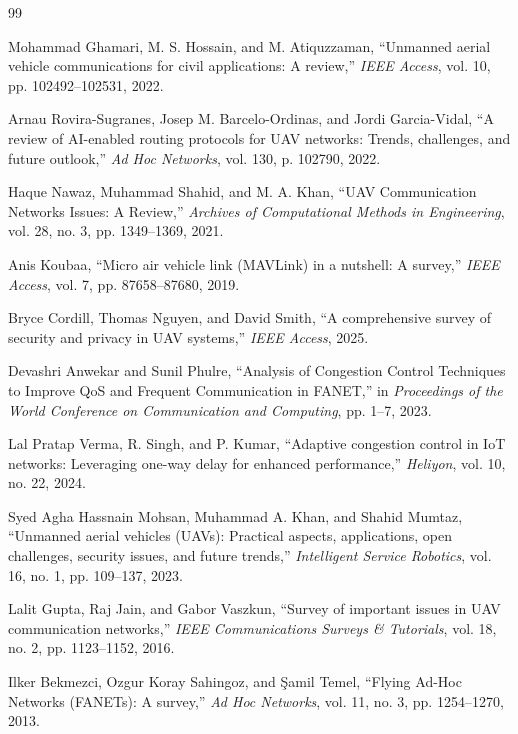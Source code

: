 \begin{thebibliography}{99}

Mohammad Ghamari, M. S. Hossain, and M. Atiquzzaman,
``Unmanned aerial vehicle communications for civil applications: A review,''
\textit{IEEE Access},
vol. 10, pp. 102492--102531, 2022.

Arnau Rovira-Sugranes, Josep M. Barcelo-Ordinas, and Jordi Garcia-Vidal,
``A review of AI-enabled routing protocols for UAV networks: Trends, challenges, and future outlook,''
\textit{Ad Hoc Networks},
vol. 130, p. 102790, 2022.

Haque Nawaz, Muhammad Shahid, and M. A. Khan,
``UAV Communication Networks Issues: A Review,''
\textit{Archives of Computational Methods in Engineering},
vol. 28, no. 3, pp. 1349--1369, 2021.

Anis Koubaa,
``Micro air vehicle link (MAVLink) in a nutshell: A survey,''
\textit{IEEE Access},
vol. 7, pp. 87658--87680, 2019.

Bryce Cordill, Thomas Nguyen, and David Smith,
``A comprehensive survey of security and privacy in UAV systems,''
\textit{IEEE Access}, 2025.

Devashri Anwekar and Sunil Phulre,
``Analysis of Congestion Control Techniques to Improve QoS and Frequent Communication in FANET,''
in \textit{Proceedings of the World Conference on Communication and Computing},
pp. 1--7, 2023.

Lal Pratap Verma, R. Singh, and P. Kumar,
``Adaptive congestion control in IoT networks: Leveraging one-way delay for enhanced performance,''
\textit{Heliyon},
vol. 10, no. 22, 2024.

Syed Agha Hassnain Mohsan, Muhammad A. Khan, and Shahid Mumtaz,
``Unmanned aerial vehicles (UAVs): Practical aspects, applications, open challenges, security issues, and future trends,''
\textit{Intelligent Service Robotics},
vol. 16, no. 1, pp. 109--137, 2023.

Lalit Gupta, Raj Jain, and Gabor Vaszkun,
``Survey of important issues in UAV communication networks,''
\textit{IEEE Communications Surveys \& Tutorials},
vol. 18, no. 2, pp. 1123--1152, 2016.

Ilker Bekmezci, Ozgur Koray Sahingoz, and Şamil Temel,
``Flying Ad-Hoc Networks (FANETs): A survey,''
\textit{Ad Hoc Networks},
vol. 11, no. 3, pp. 1254--1270, 2013.


\end{thebibliography}
